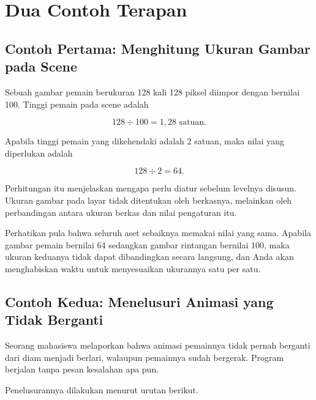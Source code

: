 \section{Dua Contoh Terapan}
\label{sec:contoh-bab-14}

\subsection{Contoh Pertama: Menghitung Ukuran Gambar pada Scene}

\begin{contohbox}
Sebuah gambar pemain berukuran 128 kali 128 piksel diimpor dengan
 bernilai 100. Tinggi pemain pada scene adalah

\[
128 \div 100 = 1{,}28 \text{ satuan}.
\]

Apabila tinggi pemain yang dikehendaki adalah 2 satuan, maka nilai
 yang diperlukan adalah

\[
128 \div 2 = 64 .
\]
\end{contohbox}

Perhitungan itu menjelaskan mengapa  perlu diatur
sebelum levelnya disusun. Ukuran gambar pada layar tidak ditentukan oleh
berkasnya, melainkan oleh perbandingan antara ukuran berkas dan nilai
pengaturan itu.

Perhatikan pula bahwa seluruh aset sebaiknya memakai nilai yang sama. Apabila
gambar pemain bernilai 64 sedangkan gambar rintangan bernilai 100, maka ukuran
keduanya tidak dapat dibandingkan secara langsung, dan Anda akan menghabiskan
waktu untuk menyesuaikan ukurannya satu per satu.

\subsection{Contoh Kedua: Menelusuri Animasi yang Tidak Berganti}

\begin{contohbox}
Seorang mahasiswa melaporkan bahwa animasi pemainnya tidak pernah berganti
dari diam menjadi berlari, walaupun pemainnya sudah bergerak. Program berjalan
tanpa pesan kesalahan apa pun.
\end{contohbox}

Penelusurannya dilakukan menurut urutan berikut.

